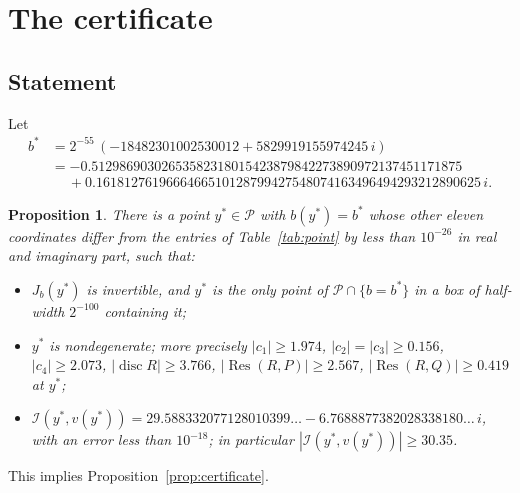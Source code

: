 \documentclass[11pt]{amsart}
\newtheorem{proposition}[theorem]{Proposition}
\theoremstyle{definition}
\theoremstyle{remark}
\numberwithin{equation}{section}
\newcommand{\cP}{\mathcal{P}}
\newcommand{\cI}{\mathcal{I}}
\newcommand{\Res}{\mathop{\mathrm{Res}}\nolimits}
\newcommand{\disc}{\mathop{\mathrm{disc}}\nolimits}
\begin{document}
\appendix

\section{The certificate}\label{app:cert}

\subsection{Statement}
Let
\begin{align*}
b^*&=2^{-55}\,(-18482301002530012+5829919155974245\,i)\\
&=-0.51298690302653582318015423879842273890972137451171875\\
&\quad\ +0.1618127619666466510128799427548074163496494293212890625\,i .
\end{align*}

\begin{proposition}\label{prop:certdetail}
There is a point $y^*\in\cP$ with $b(y^*)=b^*$ whose other eleven coordinates differ from the entries of Table~\ref{tab:point} by less than $10^{-26}$ in real and imaginary part, such that:
\begin{itemize}
\item[(a)] $J_b(y^*)$ is invertible, and $y^*$ is the only point of $\cP\cap\{b=b^*\}$ in a box of half-width $2^{-100}$ containing it;
\item[(b)] $y^*$ is nondegenerate; more precisely $|c_1|\ge1.974$, $|c_2|=|c_3|\ge0.156$, $|c_4|\ge2.073$, $|\disc R|\ge3.766$, $|\Res(R,P)|\ge2.567$, $|\Res(R,Q)|\ge0.419$ at $y^*$;
\item[(c)] $\cI(y^*,v(y^*))=29.588332077128010399\ldots-6.7688877382028338180\ldots\,i$, with an error less than $10^{-18}$; in particular $|\cI(y^*,v(y^*))|\ge30.35$.
\end{itemize}
\end{proposition}

This implies Proposition~\ref{prop:certificate}.
\end{document}
